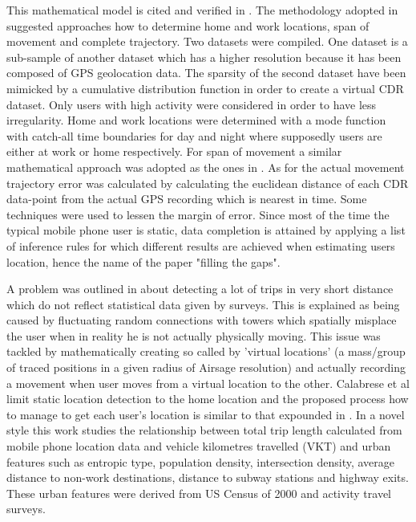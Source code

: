 \documentclass[12pt, a4paper]{report}
\theoremstyle{definition}
\theoremstyle{definition}%
\theoremstyle{definition}%
\theoremstyle{definition}%
\theoremstyle{definition}%
\theoremstyle{definition}%
\begin{document}
This mathematical model is cited and verified in \cite{Calabrese2013}. The methodology adopted in \cite{Hoteit2016} suggested approaches how to determine home and work locations, span of movement and complete trajectory. Two datasets were compiled. One dataset is a sub-sample of another dataset which has a higher resolution because it has been composed of GPS geolocation data. The sparsity of the second dataset have been mimicked by a cumulative distribution function in order to create a virtual CDR dataset. Only users with high activity were considered in order to have less irregularity. Home and work locations were determined with a mode function with catch-all time boundaries for day and night where supposedly users are either at work or home respectively. For span of movement a similar mathematical approach was adopted as the ones in \cite{Hoteit2014,Gonzalez2008}. As for the actual movement trajectory error was calculated by calculating the euclidean distance of each CDR data-point from the actual GPS recording which is nearest in time.
Some techniques were used to lessen the margin of error. Since most of the time the typical mobile phone user is static, data completion is attained by applying a list of inference rules for which different results are achieved when estimating users location, hence the name of the paper "filling the gaps".

A problem was outlined in \cite{Calabrese2013} about detecting a lot of trips in very short distance which do not reflect statistical data given by surveys. This is explained as being caused by fluctuating random connections with towers which spatially misplace the user when in reality he is not actually physically moving. This issue was tackled by mathematically creating so called by \cite{Calabrese2013} 'virtual locations' (a mass/group of traced positions in a given radius of Airsage resolution) and actually recording a movement when user moves from a virtual location to the other. Calabrese et al limit static location detection to the home location and the proposed process how to manage to get each user's location is similar to that expounded in \cite{Hoteit2016}. In a novel style this work studies the relationship between total trip length calculated from mobile phone location data and vehicle kilometres travelled (VKT) and urban features such as entropic type, population density, intersection density, average distance to non-work destinations, distance to subway stations and highway exits. These urban features were derived from US Census of 2000 and activity travel surveys.
\end{document}
